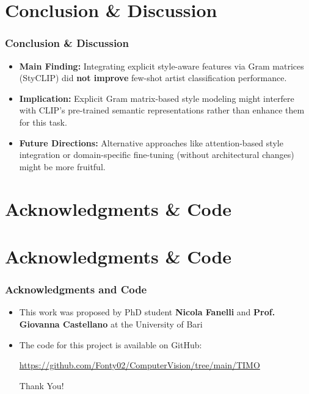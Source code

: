 \documentclass[aspectratio=169,xcolor=dvipsnames]{beamer}
\begin{document}
\section{Conclusion \& Discussion}
\begin{frame}
  \frametitle{Conclusion \& Discussion}
  \begin{itemize}
    \item \textbf{Main Finding:} Integrating explicit style-aware features via Gram matrices (StyCLIP) did \textbf{not improve} few-shot artist classification performance.
    \item \textbf{Implication:} Explicit Gram matrix-based style modeling might interfere with CLIP's pre-trained semantic representations rather than enhance them for this task.
    \item \textbf{Future Directions:} Alternative approaches like attention-based style integration or domain-specific fine-tuning (without architectural changes) might be more fruitful.
  \end{itemize}
\end{frame}

\section{Acknowledgments \& Code}

\section{Acknowledgments \& Code}
\begin{frame}
  \frametitle{Acknowledgments and Code}
  \begin{itemize}
    \item This work was proposed by PhD student \textbf{Nicola Fanelli} and \textbf{Prof. Giovanna Castellano} at the University of Bari
  \item The code for this project is available on GitHub:
  \begin{center}
    \url{https://github.com/Fonty02/ComputerVision/tree/main/TIMO}
  \end{center}
  \vspace{2em} %
  \begin{center}
    \Large Thank You! 
  \end{center}
    \end{itemize}
\end{frame}
\end{document}
